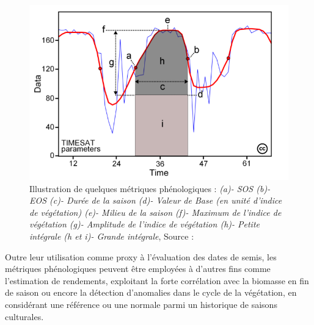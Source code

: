 \begin{figure}[htbp]
 \begin{center}
  \includegraphics[scale=0.45]{synthese_biblio/metrics.png} 
 \end{center}
 \caption[Illustration de quelques métriques phénologiques]{Illustration de quelques métriques phénologiques : \emph{(a)- SOS (b)- EOS (c)- Durée de la saison (d)- Valeur de Base (en unité d'indice de végétation) (e)- Milieu de la saison (f)- Maximum de l'indice de végétation (g)- Amplitude de l'indice de végétation (h)- Petite intégrale (h et i)- Grande intégrale}, Source : \citet{Eklundh2017}}
 \label{metrics}
\end{figure}

Outre leur utilisation comme proxy à l'évaluation des dates de semis, les métriques phénologiques peuvent être employées à d'autres fins comme l'estimation de rendements, exploitant 
la forte corrélation avec la biomasse en fin de saison ou encore la détection d'anomalies dans le cycle de la végétation, en considérant une référence ou une normale parmi un 
historique de saisons culturales.

\vspace{5mm}


